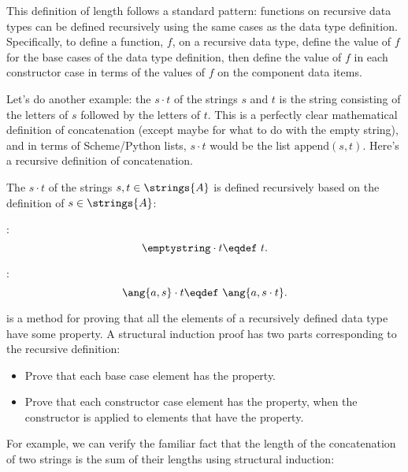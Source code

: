 This definition of length follows a standard pattern: functions on
recursive data types can be defined recursively using the same cases
as the data type definition.  Specifically, to define a function, $f$,
on a recursive data type, define the value of $f$ for the base cases
of the data type definition, then define the value of $f$ in each
constructor case in terms of the values of $f$ on the component data
items.

Let's do another example: the  $s\cdot t$ of the
strings $s$ and $t$ is the string consisting of the letters of $s$
followed by the letters of $t$.  This is a perfectly clear
mathematical definition of concatenation (except maybe for what to do
with the empty string), and in terms of Scheme/Python lists, $s\cdot
t$ would be the list $\text{append}(s, t)$.  Here's a recursive
definition of concatenation.

\begin{definition}\label{concat_def}
The  $s\cdot t$ of the strings $s,t \in
\strings{A}$ is defined recursively based on the definition of $s \in
\strings{A}$:

\item {}:     %
\[
\emptystring \cdot t \eqdef\ t.
\]

\item {}: %
\[
\ang{a,s} \cdot t \eqdef\ \ang{a, s \cdot t}.
\]
\end{definition}

 is a method for proving that all the elements
of a recursively defined data type have some property.  A structural
induction proof has two parts corresponding to the recursive definition:
\begin{itemize}
\item Prove that each base case element has the property.
\item Prove that each constructor case element has the property, when
  the constructor is applied to elements that have the property.
\end{itemize}

For example, we can verify the familiar fact that the length of the
concatenation of two strings is the sum of their lengths using structural
induction:

